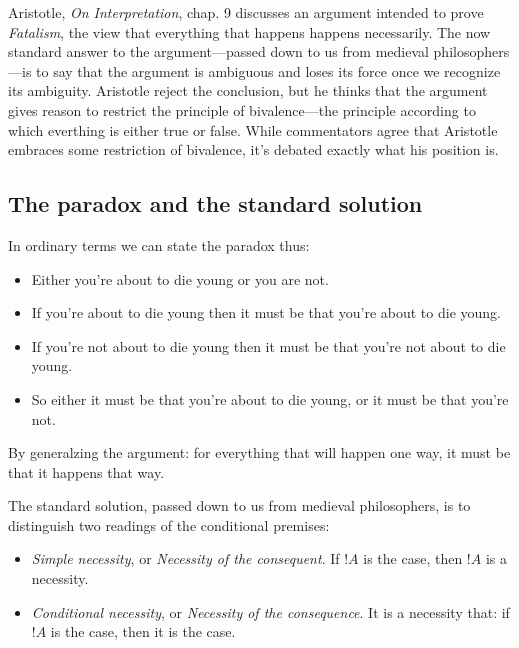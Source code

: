 \documentclass[../../../include/open-logic-section]{subfiles}
\begin{document}


Aristotle, \emph{On Interpretation}, chap. 9 discusses an argument intended to prove \emph{Fatalism}, the view that everything that happens happens necessarily. The now standard answer to the argument---passed down to us from medieval philosophers---is to say that the argument is ambiguous and loses its force once we recognize its ambiguity. Aristotle reject the conclusion, but he thinks that the argument gives reason to restrict the principle of bivalence---the principle according to which everthing is either true or false. While commentators agree that Aristotle embraces some restriction of bivalence, it's debated exactly what his position is.

\subsection{The paradox and the standard solution}

In ordinary terms we can state the paradox thus:

\begin{itemize}
	\item Either you're about to die young or you are not.
	\item If you're about to die young then it must be that you're about to die young. 
	\item If you're not about to die young then it must be that you're not about to die young.
	\item So either it must be that you're about to die young, or it must be that you're not.
\end{itemize}

By generalzing the argument: for everything that will happen one way, it must be that it happens that way.

The standard solution, passed down to us from medieval philosophers, is to distinguish two readings of the conditional premises: 

\begin{itemize}
	\item \emph{Simple necessity}, or \emph{Necessity of the consequent}. If $!A$ is the case, then $!A$ is a necessity. 
	\item \emph{Conditional necessity}, or \emph{Necessity of the consequence}. It is a necessity that: if $!A$ is the case, then it is the case.
\end{itemize}
\end{document}
